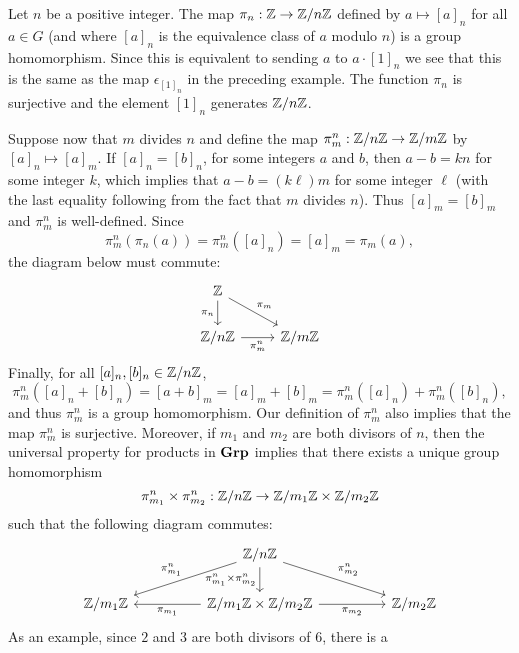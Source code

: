 \begin{example}
    \label{ex:homomorphism-Z-to-ZnZ}
    Let \(n\) be a positive integer. The map \(\pi_n : \mathbb{Z} \to \mathbb{Z}/n\mathbb{Z}\) defined
    by \(a \mapsto [a]_n\) for all \(a \in G\) (and where \([a]_n\) is the
    equivalence class of \(a\) modulo \(n\)) is a group homomorphism. Since this
    is equivalent to sending \(a\) to \(a \cdot [1]_n\) we see that this is the
    same as the map \(\epsilon_{[1]_n}\) in the preceding example. The function
    \(\pi_n\) is surjective and the element \([1]_n\) generates \(\mathbb{Z}/n\mathbb{Z}\).

    Suppose now that \(m\) divides \(n\) and define the map \(\pi^n_m : \mathbb{Z}/n\mathbb{Z}
    \to \mathbb{Z}/m\mathbb{Z}\) by \([a]_n \mapsto [a]_m\). If \([a]_n = [b]_n\), for some
    integers \(a\) and \(b\), then \(a - b = kn\) for some integer \(k\), which
    implies that \(a - b = (k\ell)m\) for some integer \(\ell\) (with the last
    equality following from the fact that \(m\) divides \(n\)). Thus \([a]_m =
    [b]_m\) and \(\pi^n_m\) is well-defined. Since
    \[
        \pi^n_m(\pi_n(a)) = \pi^n_m([a]_n) = [a]_m = \pi_m(a),
    \]
    the diagram below must commute:
    \[
        \begin{tikzcd}
            \mathbb{Z} \arrow[rd, "\pi_m"] \arrow[d, "\pi_n"'] &                        \\
            \mathbb{Z}/n\mathbb{Z} \arrow[r, "\pi^n_m"']       & \mathbb{Z}/m\mathbb{Z}
        \end{tikzcd}
    \]
    Finally, for all \([a]_n, [b]_n \in \mathbb{Z}/n\mathbb{Z}\),
    \[
        \pi^n_m([a]_n + [b]_n) = [a + b]_m = [a]_m + [b]_m = \pi^n_m([a]_n) + \pi^n_m([b]_n),
    \]
    and thus \(\pi^n_m\) is a group homomorphism. Our definition of \(\pi^n_m\)
    also implies that the map \(\pi^n_m\) is surjective. Moreover, if \(m_1\)
    and \(m_2\) are both divisors of \(n\), then the universal property for
    products in \(\mathbf{Grp}\) implies that there exists a unique group homomorphism
    \[\pi^n_{m_1} \times \pi^n_{m_2} : \mathbb{Z}/n\mathbb{Z} \to \mathbb{Z}/m_1\mathbb{Z} \times \mathbb{Z}/m_2\mathbb{Z}\]
    such that the following diagram commutes:
    \[
        \begin{tikzcd}
            &  & \Z/n\Z \arrow[lld, "\pi^n_{m_1}"'] \arrow[rrd, "\pi^n_{m_2}"] \arrow[d, swap, "\pi^n_{m_1} \times \pi^n_{m_2}"] &  &          \\
        \Z/m_1\Z &  & \Z/m_1\Z \times \Z/m_2\Z \arrow[rr, "\pi_{m_2}"'] \arrow[ll, "\pi_{m_1}"]                                 &  & \Z/m_2\Z
        \end{tikzcd}
    \]
    As an example, since \(2\) and \(3\) are both divisors of \(6\), there is a

\end{example}
